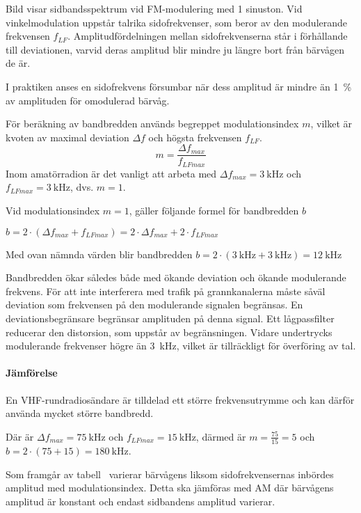 Bild  visar sidbandsspektrum vid FM-moduler\-ing med 1
sinuston.
Vid vinkelmodulation uppstår talrika sidofrekvenser, som beror av den
modulerande frekvensen \(f_{LF}\).
Amplitudfördelningen mellan sidofrekvenserna står i förhållande till
deviationen, varvid deras amplitud blir mindre ju längre bort från bärvågen
de är.

I praktiken anses en sidofrekvens försumbar när dess amplitud är mindre än 1~\%
av amplituden för omodulerad bärvåg.

För beräkning av bandbredden används begreppet modulationsindex \(m\), vilket är
kvoten av maximal deviation \(\Delta f\) och högsta frekvensen \(f_{LF}\).
\[m = \dfrac{\Delta f_{max}}{f_{LFmax}}\]
Inom amatörradion är det vanligt att arbeta med \(\Delta f_{max} =
\qty{3}{\kilo\hertz}\) och \(f_{LFmax} = \qty{3}{\kilo\hertz}\), dvs. \(m = 1\).

Vid modulationsindex \(m = 1\), gäller följande formel för bandbredden \(b\)

\medskip
\(b = 2 \cdot ( \Delta f_{max} + f_{LFmax}) = 2 \cdot \Delta f_{max}
 + 2 \cdot f_{LFmax}\)
 \medskip
 
Med ovan nämnda värden blir bandbredden \(b = 2 \cdot (\qty{3}{\kilo\hertz} +
\qty{3}{\kilo\hertz}) = \qty{12}{\kilo\hertz}\)

Bandbredden ökar således både med ökande deviation och ökande modulerande
frekvens.
För att inte interferera med trafik på grannkanalerna måste såväl deviation som
frekvensen på den modulerande signalen begränsas.
En deviationsbegränsare begränsar amplituden på denna signal.
Ett lågpassfilter reducerar den distorsion, som uppstår av begränsningen.
Vidare undertrycks modulerande frekvenser högre än \qty{3}{\kilo\hertz}, vilket
är tillräckligt för överföring av tal.

\paragraph{Jämförelse}

En VHF-rundradiosändare är tilldelad ett större frekvensutrymme och kan därför
använda mycket större bandbredd.

Där är \(\Delta f_{max} = \qty{75}{\kilo\hertz}\) och \(f_{LFmax} =
\qty{15}{\kilo\hertz}\), därmed är \(m = \frac{75}{15} = 5\) och \(b = 2 \cdot
(75 + 15) = \qty{180}{\kilo\hertz}\).

Som framgår av tabell~ varierar bärvågens liksom
sidofrekvensernas inbördes amplitud med modulationsindex.
Detta ska jämföras med AM där bärvågens amplitud är konstant och endast
sidbandens amplitud varierar.

